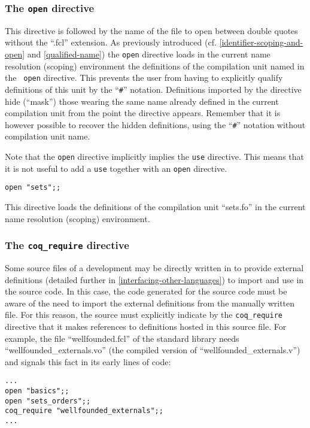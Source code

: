 \subsubsection{The {\tt open} directive}

This directive is followed by the name of the file to open between
double quotes without the ``.fcl'' extension. As previously introduced
(cf. \ref{identifier-scoping-and-open} and \ref{qualified-name}) the
{\tt open} directive loads in the current name resolution (scoping)
environment the definitions of the compilation unit named in the {\tt
  open} directive. This prevents the user from having to explicitly
qualify definitions of this unit by the ``{\tt\#}''
notation. Definitions imported by the directive hide (``mask'') those
wearing the same name already defined in the current compilation unit
from the point the directive appears. Remember that it is however
possible to recover the hidden definitions, using the ``{\tt\#}''
notation without compilation unit name.

Note that the {\tt open} directive implicitly implies the {\tt use}
directive. This means that it is not useful to add a {\tt use}
together with an {\tt open} directive.

{\scriptsize
\begin{lstlisting}
open "sets";;
\end{lstlisting}
}This directive loads the definitions of the compilation unit
``sets.fo'' in the current name resolution (scoping) environment.




\subsubsection{The {\tt coq\_require} directive}
Some source files of a development may be directly written in {\coq} to
provide external definitions (detailed further in
\ref{interfacing-other-languages}) to import and use in the %
{\focal} source code. In this case, the {\coq} code generated for the
{\focal} source code must be aware of the need to import the external
definitions from the manually written {\coq} file. For this reason, the
{\focal} source must explicitly indicate by the {\tt coq\_require}
directive that it makes references to definitions hosted in this
{\coq} source file. For example, the file ``wellfounded.fcl'' of the
standard library needs ``wellfounded\_externals.vo'' (the compiled version of
``wellfounded\_externals.v'') and signals this
fact in its early lines of code:
{\scriptsize
\begin{lstlisting}
...
open "basics";;
open "sets_orders";;
coq_require "wellfounded_externals";;
...
\end{lstlisting}
}




